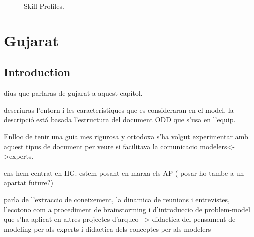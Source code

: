 \documentclass[11pt,oneside,a4paper,openright]{report}
\begin{document}
\begin{figure}[h]
\centering
\setlength\fboxsep{0pt}
\setlength\fboxrule{0.5pt}
\caption{Skill Profiles.}
\label{fig:SkillProfiles}
\end{figure}


\chapter{Gujarat}

\section{Introduction}
dius que parlaras de gujarat a aquest cap\'itol.

descriuras l'entorn i les caracter\'istiques que es consideraran en el model.
la descripci\'o est\'a basada l'estructura del document ODD que s'usa en l'equip.

Enlloc de tenir una guia mes rigurosa y ortodoxa s'ha volgut experimentar amb aquest
tipus de document per veure si facilitava la comunicacio modelers<->experts.

ens hem centrat en HG. estem posant en marxa els AP ( posar-ho tambe a un apartat future?)

parla de l'extraccio de coneixement, la dinamica de reunions i entrevistes, l'ecotono com a 
procediment de brainstorming i d'introduccio de problem-model que s'ha aplicat
en altres projectes d'arqueo --> didactica del pensament de modeling per als experts
i didactica dels conceptes per als modelers
\end{document}
